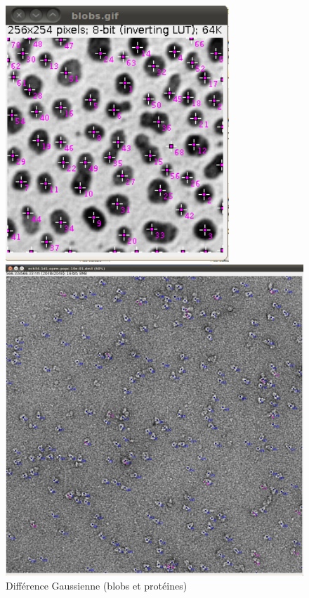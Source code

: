\begin{figure}[ht]
\begin{center}
 \begin{minipage}{.450\linewidth}
  \includegraphics[width=0.75\textwidth]{blobsDog.png}  
 \end{minipage} \hfill
\begin{minipage}{.450\linewidth}
  \includegraphics[width=1\textwidth]{protDog.png}   
 \end{minipage} \hfill
\caption{Différence Gaussienne (blobs et protéines)}
\end{center}
\end{figure}

